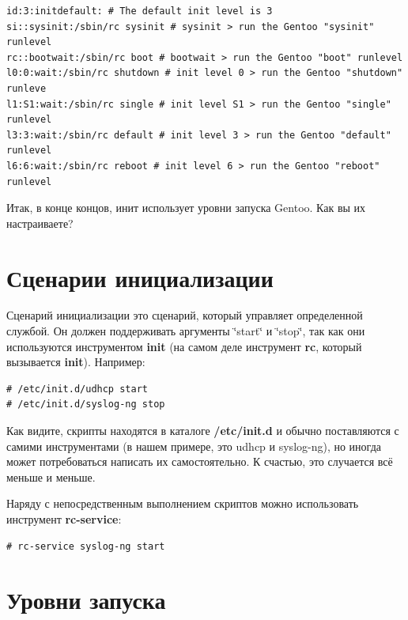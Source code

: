 \documentclass[10pt]{book}
\begin{document}
\begin{tcolorbox} 
\begin{lstlisting}
id:3:initdefault: # The default init level is 3
si::sysinit:/sbin/rc sysinit # sysinit > run the Gentoo "sysinit" runlevel
rc::bootwait:/sbin/rc boot # bootwait > run the Gentoo "boot" runlevel
l0:0:wait:/sbin/rc shutdown # init level 0 > run the Gentoo "shutdown" runleve
l1:S1:wait:/sbin/rc single # init level S1 > run the Gentoo "single" runlevel
l3:3:wait:/sbin/rc default # init level 3 > run the Gentoo "default" runlevel
l6:6:wait:/sbin/rc reboot # init level 6 > run the Gentoo "reboot" runlevel
\end{lstlisting}
\end{tcolorbox}

Итак, в конце концов, инит использует уровни запуска Gentoo. Как вы
их настраиваете?

\section{Сценарии инициализации}

Сценарий инициализации \textendash{} это сценарий, который управляет
определенной службой. Он должен поддерживать аргументы \char`\"{}start\char`\"{}
и \char`\"{}stop\char`\"{}, так как они используются инструментом
\textbf{init} (на самом деле инструмент \textbf{rc}, который вызывается
\textbf{init}). Например:

\begin{tcolorbox} 
\begin{lstlisting}
# /etc/init.d/udhcp start
# /etc/init.d/syslog-ng stop
\end{lstlisting}
\end{tcolorbox}

Как видите, скрипты находятся в каталоге \textbf{/etc/init.d} и обычно
поставляются с самими инструментами (в нашем примере, это udhcp и
syslog-ng), но иногда может потребоваться написать их самостоятельно.
К счастью, это случается всё меньше и меньше.

Наряду с непосредственным выполнением скриптов можно использовать
инструмент \textbf{rc-service}:

\begin{tcolorbox} 
\begin{lstlisting}
# rc-service syslog-ng start
\end{lstlisting}
\end{tcolorbox}

\section{Уровни запуска}
\end{document}
